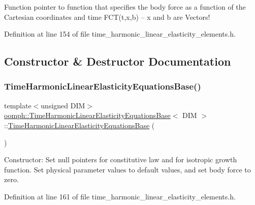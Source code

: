 Function pointer to function that specifies the body force as a function of the Cartesian coordinates and time F\+C\+T(t,x,b) -- x and b are Vectors! 



Definition at line 154 of file time\+\_\+harmonic\+\_\+linear\+\_\+elasticity\+\_\+elements.\+h.



\subsection{Constructor \& Destructor Documentation}
\mbox{\label{classoomph_1_1TimeHarmonicLinearElasticityEquationsBase_a993b2b5b1542dbb8f2c1cd2202c764d4}} 
\subsubsection{\texorpdfstring{Time\+Harmonic\+Linear\+Elasticity\+Equations\+Base()}{TimeHarmonicLinearElasticityEquationsBase()}}
{\footnotesize\ttfamily template$<$unsigned D\+IM$>$ \\
\hyperlink{classoomph_1_1TimeHarmonicLinearElasticityEquationsBase}{oomph\+::\+Time\+Harmonic\+Linear\+Elasticity\+Equations\+Base}$<$ D\+IM $>$\+::\hyperlink{classoomph_1_1TimeHarmonicLinearElasticityEquationsBase}{Time\+Harmonic\+Linear\+Elasticity\+Equations\+Base} (\begin{DoxyParamCaption}{ }\end{DoxyParamCaption})\hspace{0.3cm}{\ttfamily [inline]}}



Constructor\+: Set null pointers for constitutive law and for isotropic growth function. Set physical parameter values to default values, and set body force to zero. 



Definition at line 161 of file time\+\_\+harmonic\+\_\+linear\+\_\+elasticity\+\_\+elements.\+h.



